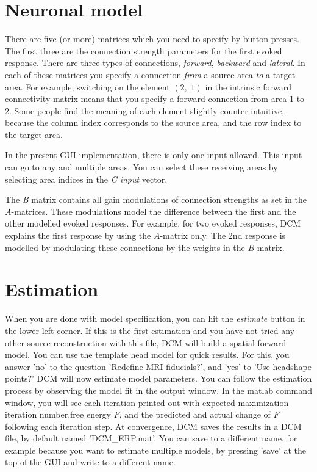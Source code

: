 \section{Neuronal model}
There are five (or more) matrices which you need to specify by button presses. The
first three are the connection strength parameters for the first
evoked response. There are three types of connections,
\textit{forward}, \textit{backward} and \textit{lateral}. In each of 
these matrices you specify a connection \textit{from} a source area
\textit{to} a target area. For example, switching on the element
$(2,\;1)$ in the intrinsic forward connectivity matrix means that you
specify a forward connection from area 1 to 2. Some people find the
meaning of each element slightly counter-intuitive, because the
column index corresponds to the source area, and the row index to the
target area. 

In the present GUI implementation, there is only one input
allowed. This input can go to any and multiple areas. You can select
these receiving areas by selecting area indices in the \textit{C input} vector.

The \textit{B} matrix contains all gain modulations of connection
strengths as set in the $A$-matrices. These modulations model the
difference between the first and the other modelled evoked
responses. For example, for two evoked responses, DCM explains the
first response by using the $A$-matrix only. The 2nd response is
modelled by modulating these connections by the weights in
the $B$-matrix.

\section{Estimation}
When you are done with model specification, you can hit the
\textit{estimate} button in the lower left corner. If this is the
first estimation and you have not tried any other source
reconstruction with this file, DCM will build a spatial forward
model. You can use the template head model for quick results. For
this, you answer 'no' to the question 'Redefine MRI fiducials?', and
'yes' to 'Use headshape points?' DCM will now
estimate model parameters. You can follow the estimation process by
observing the model fit in the output window. In the matlab command
window, you will see each iteration printed out with
expected-maximization iteration number,free energy $F$, and the
predicted and actual change of $F$ following each iteration
step. At convergence, DCM saves the results in a DCM file, by default
named 'DCM\_ERP.mat'. You can save to a different name, for example
because you want to estimate multiple models, by pressing 'save' at
the top of the GUI and write to a different name. 

